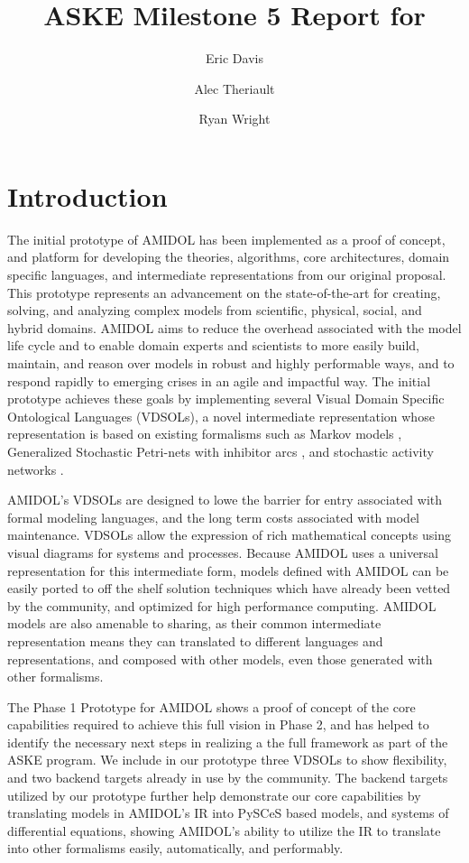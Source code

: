 \documentclass[11pt]{article}
\date{\vspace{-5ex}}
\author[1]{Eric Davis}
\author[1]{Alec Theriault}
\author[1]{Ryan Wright}
\affil[1]{Galois, Inc}
\title{ASKE Milestone 5 Report for \amidol{}}
\newcommand{\amidol}{\textsc{AMIDOL}}
\begin{document}
\maketitle
\vspace{10pt}

\section{Introduction}

The initial prototype of \amidol{} has been implemented as a proof of
concept, and platform for developing the theories, algorithms, core
architectures, domain specific languages, and intermediate
representations from our original proposal.  This prototype represents
an advancement on the state-of-the-art for creating, solving, and
analyzing complex models from scientific, physical, social, and hybrid
domains.  \amidol{} aims to reduce the overhead associated with the
model life cycle and to enable domain experts and scientists to more
easily build, maintain, and reason over models in robust and highly
performable ways, and to respond rapidly to emerging crises in an
agile and impactful way.  The initial prototype achieves these goals
by implementing several Visual Domain Specific Ontological Languages
(VDSOLs), a novel intermediate representation whose representation is
based on existing formalisms such as Markov models
\cite{howard2012dynamic}, Generalized Stochastic Petri-nets with
inhibitor arcs \cite{chiola1993generalized}, and stochastic activity
networks \cite{movaghar1985performability,sanders2000stochastic}.

\amidol{}'s VDSOLs are designed to lowe the barrier for entry
associated with formal modeling languages, and the long term costs
associated with model maintenance.  VDSOLs allow the expression of
rich mathematical concepts using visual diagrams for systems and
processes.  Because \amidol{} uses a universal representation for this
intermediate form, models defined with \amidol{} can be easily ported
to off the shelf solution techniques which have already been vetted by
the community, and optimized for high performance computing.
\amidol{} models are also amenable to sharing, as their common
intermediate representation means they can translated to different
languages and representations, and composed with other models, even
those generated with other formalisms.

The Phase 1 Prototype for \amidol{} shows a proof of concept of the
core capabilities required to achieve this full vision in Phase 2, and
has helped to identify the necessary next steps in realizing a the
full framework as part of the ASKE program.  We include in our
prototype three VDSOLs to show flexibility, and two backend targets
already in use by the community.  The backend targets utilized by our
prototype further help demonstrate our core capabilities by
translating models in \amidol{}'s IR into PySCeS based models, and
systems of differential equations, showing \amidol{}'s ability to
utilize the IR to translate into other formalisms easily,
automatically, and performably.
\end{document}
